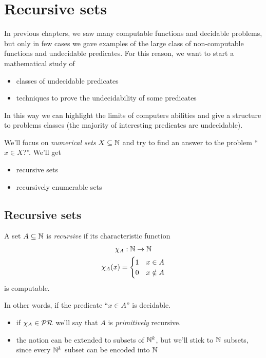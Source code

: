 \chapter{Recursive sets}
In previous chapters, we saw many computable functions and decidable problems, but
only in few cases we gave examples of the large class of
non-computable functions and undecidable predicates. For this reason,
we want to start a mathematical study of
\begin{itemize}
  \item classes of undecidable predicates
  \item techniques to prove the undecidability of some predicates
\end{itemize}
In this way we can highlight the limits of computers abilities and give a
structure to problems classes (the majority of interesting
predicates are undecidable).

We'll focus on \emph{numerical sets} $X \subseteq \mathbb{N}$ and try to find
an answer to the problem ``$x \in X$?''. We'll get
\begin{itemize}
\item recursive sets
\item recursively enumerable sets
\end{itemize}

\section{Recursive sets}
\begin{definition}
  A set $A \subseteq \mathbb{N}$ is \emph{recursive} if its characteristic
  function
  \begin{gather*}
    \chi_A : \mathbb{N} \to \mathbb{N} \\
    \chi_A(x) = \begin{cases}
      1 & x\in A \\
      0 & x \notin A
    \end{cases}
  \end{gather*}
  is computable.
\end{definition}
In other words, if the predicate ``$x \in A$'' is decidable.

\begin{observation}
  \begin{itemize}
    \item if $\chi_A \in \mathcal{PR}$ we'll say that $A$ is \emph{primitively}
      recursive.
    \item the notion can be extended to subsets of $\mathbb{N}^k$, but we'll
      stick to $\mathbb{N}$ subsets, since every $\mathbb{N}^k$ subset can be encoded
      into $\mathbb{N}$
    \end{itemize}
\end{observation}


